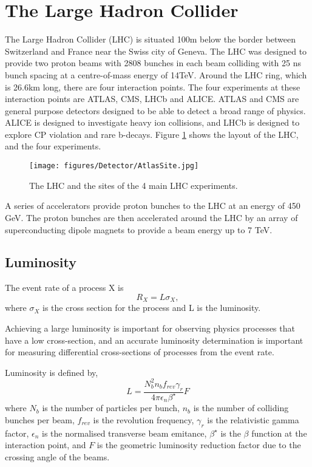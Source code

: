 \section{The Large Hadron Collider}
\label{sec:Det:LHC}

The Large Hadron Collider (LHC) is situated 100m below the border between Switzerland and France near the Swiss city of Geneva. 
The LHC was designed to provide two proton beams with 2808 bunches in each beam colliding with 25 ns bunch spacing at a centre-of-mass energy of 14TeV.
Around the LHC ring, which is 26.6km long, there are four interaction points. 
The four experiments at these interaction points are ATLAS, CMS, LHCb and ALICE.
ATLAS and CMS are general purpose detectors designed to be able to detect a broad range of physics. ALICE is designed to investigate heavy ion collisions, and LHCb is designed to explore CP violation and rare b-decays.
Figure \ref{Det:LHC} shows the layout of the LHC, and the four experiments.

\begin{figure}
\centering
\texttt{[image: figures/Detector/AtlasSite.jpg]}
  \caption{The LHC and the sites of the 4 main LHC experiments.}
\label{Det:LHC}
\end{figure}

A series of accelerators provide proton bunches to the LHC at an energy of 450 GeV.
The proton bunches are then accelerated around the LHC by an array of superconducting dipole magnets to provide a beam energy up to 7 TeV.


\subsection{Luminosity}

The event rate of a process X is
\begin{equation}
R_X = L \sigma_X,
\label{Det:Lumi}
\end{equation}
where $\sigma_X$ is the cross section for the process and L is the luminosity.

Achieving a large luminosity is important for observing physics processes that have a low cross-section, and an accurate luminosity determination is important for measuring differential cross-sections of processes from the event rate. 

Luminosity is defined by,
\begin{equation}
L=\frac{N_b^2n_bf_{rev}\gamma_r}{4\pi\epsilon_n\beta^\star}F
\label{Det:Lumi}
\end{equation}
where $N_b$ is the number of particles per bunch, $n_b$ is the number of colliding bunches per beam, $f_{rev}$ is the revolution frequency, $\gamma_r$ is the relativistic gamma factor, $\epsilon_n$ is the normalised transverse beam emitance, $\beta^\star$ is the $\beta$ function at the interaction point, and $F$ is the geometric luminosity reduction factor due to the crossing angle of the beams.


